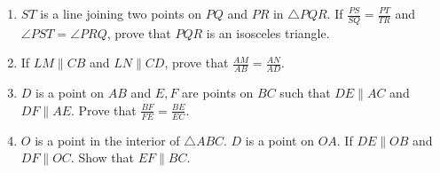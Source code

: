 \begin{enumerate}[label=\arabic*.,ref=\thesubsection.\theenumi]
\item $ST$ is a line joining two points on $PQ$ and $PR$ in $\triangle PQR$.  If $\frac{PS}{ SQ}=\frac{PT}{ TR}$ and $ \angle  PST = \angle  PRQ$, prove that $PQR$ is an isosceles triangle.
%
\item If $LM  \parallel  CB$ and $LN  \parallel  CD$, prove that $\frac{AM}{AB} = \frac{ AN}{AD}$.
%
\item $D$ is a point on $AB$ and $E, F$ are points on $BC$ such that $DE  \parallel  AC$ and $DF  \parallel  AE$. Prove that $\frac{BF} {FE} =\frac{BE}  {EC}$.
%
\item $O$ is a point in the interior of $\triangle ABC$. $D$ is a point on $OA$.  If $DE  \parallel  OB$ and $DF  \parallel  OC$. Show that $EF  \parallel  BC$.

\end{enumerate}
